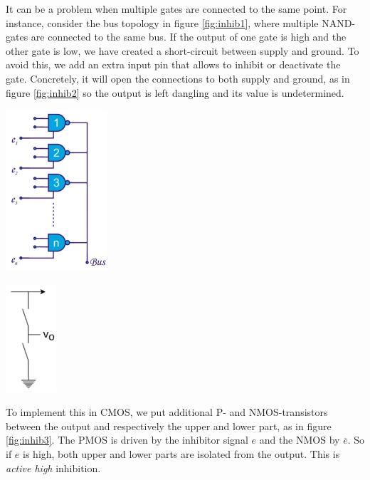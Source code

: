 It can be a problem when multiple gates are connected to the same point. For instance, consider the bus topology in figure \ref{fig:inhib1}, where multiple NAND-gates are connected to the same bus. If the output of one gate is high and the other gate is low, we have created a short-circuit between supply and ground. To avoid this, we add an extra input pin that allows to inhibit or deactivate the gate. Concretely, it will open the connections to both supply and ground, as in figure \ref{fig:inhib2} so the output is left dangling and its value is undetermined.

\begin{minipage}{.5\textwidth}
	\centering
	\includegraphics[height=6cm]{figures/ch13/inhib1.jpg}
	\label{fig:inhib1}
\end{minipage}%
\begin{minipage}{.5\textwidth}
	\centering
	\includegraphics[height=4cm]{figures/ch13/inhib2.jpg}
	\label{fig:inhib2}
\end{minipage}

To implement this in CMOS, we put additional P- and NMOS-transistors between the output and respectively the upper and lower part, as in figure \ref{fig:inhib3}. The PMOS is driven by the inhibitor signal $e$ and the NMOS by $\overline{e}$. So if $e$ is high, both upper and lower parts are isolated from the output. This is \emph{active high} inhibition.

